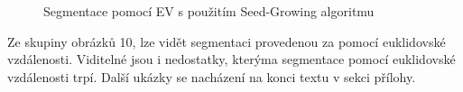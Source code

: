 \documentclass[czech, master, public, dept460, male, cpdeclaration, oneside]{diploma}
\begin{document}
\begin{figure}[H]
	\centering	
	\qquad
	\caption{Segmentace pomocí EV s použitím Seed-Growing algoritmu}
\end{figure}
\noindent
Ze skupiny obrázků 10, lze vidět segmentaci provedenou za pomocí euklidovské vzdálenosti. Viditelné jsou i nedostatky, kterýma segmentace pomocí euklidovské vzdálenosti trpí. Další ukázky se nacházení na konci textu v sekci přílohy.
\end{document}
